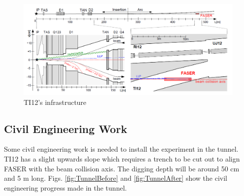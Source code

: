 \begin{figure}[htbp!] 
\centering    
\includegraphics[width=1.0\textwidth]{FASERinfrastructureTI12.png}
\caption[TI12 Infrastructure]{TI12's infrastructure}
\label{fig:infrastructure}
\end{figure}

\subsection{Civil Engineering Work}

Some civil engineering work is needed to install the experiment in the tunnel. TI12 has a slight upwards slope which requires a trench to be cut out to align FASER with the beam collision axis. The digging depth will be around 50 cm and 5 m long. Figs. \ref{fig:TunnelBefore} and \ref{fig:TunnelAfter} show the civil engineering progress made in the tunnel.

